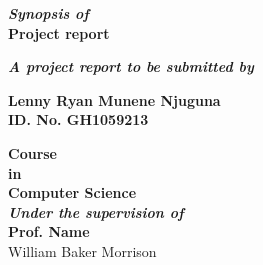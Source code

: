 \documentclass[12pt,a4paper,oneside]{report}
\begin{document}
\thispagestyle{empty}
\begin{center}
    {\textbf{\textit{Synopsis of}\\}}
   {\Large\bf{Project report} \\}

			    
			       \vspace{0.3in}
			     
			      
  {\textbf{\textit  {A project report to be submitted by\\}}}
		       


			     \vspace{0.4in}
			    {\large \bf Lenny Ryan Munene Njuguna \\
			    ID. No. GH1059213\\}
			 
			  \vspace{0.3 in}

		       
		       \vspace{0.3 in}

		       
			    {\Large{\bf Course \\ in \\Computer Science}\\}
                   \vspace{0.3in}
                {\bf\textit{Under the supervision of\\ }}
			{\Large{\bf Prof. Name}\\William Baker Morrison}		    
                \vspace{0.3in}


   
\end{center}
\date{}
\setcounter{page}{0}
\end{document}
